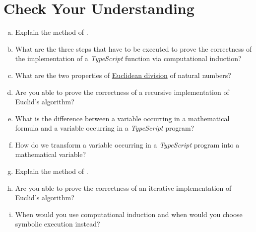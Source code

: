 \section{Check Your Understanding}
\begin{enumerate}[(a)]
\item Explain the method of .  
\item What are the three steps that have to be executed to prove the correctness of the implementation of a
      \textsl{TypeScript} function via computational induction?
\item What are the two properties of \href{https://en.wikipedia.org/wiki/Euclidean_division}{Euclidean division} of natural numbers?
\item Are you able to prove the correctness of a recursive implementation of Euclid's algorithm?
\item What is the difference between a variable occurring in a mathematical formula and a variable occurring in
      a \textsl{TypeScript} program?
\item How do we transform a variable occurring in a \textsl{TypeScript} program into a mathematical variable?
\item Explain the method of .
\item Are you able to prove the correctness of an iterative implementation of Euclid's algorithm?
\item When would you use computational induction and when would you choose symbolic execution instead?
\end{enumerate}

